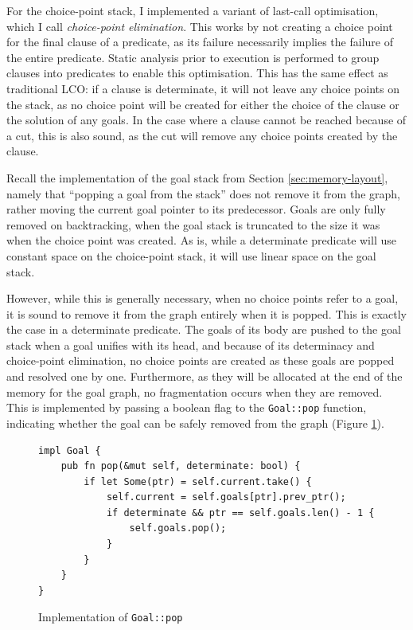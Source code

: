 For the choice-point stack, I implemented a variant of last-call optimisation, which I call \emph{choice-point elimination}. This works by not creating a choice point for the final clause of a predicate, as its failure necessarily implies the failure of the entire predicate. Static analysis prior to execution is performed to group clauses into predicates to enable this optimisation. This has the same effect as traditional LCO: if a clause is determinate, it will not leave any choice points on the stack, as no choice point will be created for either the choice of the clause or the solution of any goals. In the case where a clause cannot be reached because of a cut, this is also sound, as the cut will remove any choice points created by the clause.

Recall the implementation of the goal stack from Section \ref{sec:memory-layout}, namely that ``popping a goal from the stack'' does not remove it from the graph, rather moving the current goal pointer to its predecessor. Goals are only fully removed on backtracking, when the goal stack is truncated to the size it was when the choice point was created. As is, while a determinate predicate will use constant space on the choice-point stack, it will use linear space on the goal stack.

However, while this is generally necessary, when no choice points refer to a goal, it is sound to remove it from the graph entirely when it is popped. This is exactly the case in a determinate predicate. The goals of its body are pushed to the goal stack when a goal unifies with its head, and because of its determinacy and choice-point elimination, no choice points are created as these goals are popped and resolved one by one. Furthermore, as they will be allocated at the end of the memory for the goal graph, no fragmentation occurs when they are removed. This is implemented by passing a boolean flag to the \texttt{Goal::pop} function, indicating whether the goal can be safely removed from the graph (Figure \ref{fig:goal-pop}).

\begin{figure}[H]
\centering
\begin{verbatim}
impl Goal {
    pub fn pop(&mut self, determinate: bool) {
        if let Some(ptr) = self.current.take() {
            self.current = self.goals[ptr].prev_ptr();
            if determinate && ptr == self.goals.len() - 1 {
                self.goals.pop();
            }
        }
    }
}
\end{verbatim}
\caption{Implementation of \texttt{Goal::pop}}
\label{fig:goal-pop}
\end{figure}


